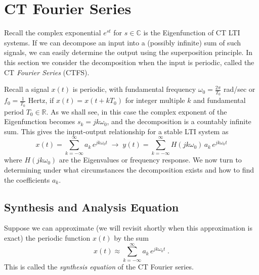 \section{CT Fourier Series}

Recall the complex exponential $e^{st}$ for $s\in\mathbb{C}$ is the Eigenfunction of CT LTI systems. If we can decompose an input into a (possibly infinite) sum of such signals, we can easily determine the output using the superposition principle. In this section we consider the decomposition when the input is periodic, called the CT \emph{Fourier Series} (CTFS).

Recall a signal $x(t)$ is periodic, with fundamental frequency $\omega_0 = \frac{2\pi}{T_0}$ rad/sec or $f_0 = \frac{1}{T_0}$ Hertz, if $x(t) = x(t+kT_0)$ for integer multiple $k$ and fundamental period $T_0\in \mathbb{R}$. As we shall see, in this case the complex exponent of the Eigenfunction becomes $s_k = jk\omega_0$, and the decomposition is a countably infinite sum. This gives the input-output relationship for a stable LTI system as 
\[
x(t) = \sum\limits_{k = -\infty}^{\infty} a_k \, e^{j k\omega_0 t} \; \longrightarrow\; y(t) = \sum\limits_{k = -\infty}^{\infty} H(j k\omega_0)\, a_k \, e^{j k\omega_0 t}
\]
where $H(j k\omega_0)$ are the Eigenvalues or frequency response. We now turn to determining under what circumstances the decomposition exists and how to find the coefficients $a_k$.

\subsection{Synthesis and Analysis Equation}

Suppose we can approximate (we will revisit shortly when this approximation is exact) the periodic function $x(t)$ by the sum
\[
\boxed{x(t) \approx \sum\limits_{k = -\infty}^{\infty} a_k \, e^{j k\omega_0 t}\;.}
\]
This is called the \emph{synthesis equation} of the CT Fourier series.

